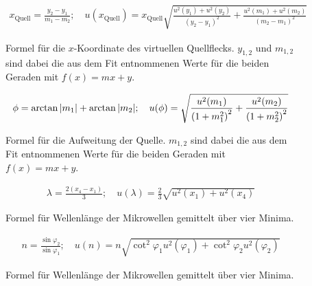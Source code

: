 \begin{figure}[ht]
	\begin{align*}
		x_\text{Quell} = \frac{y_2 - y_1}{m_1 - m_2}
		;\quad
		u(x_\text{Quell}) = x_\text{Quell} \sqrt{\frac{u^2(y_1) + u^2(y_2)}{(y_2 - y_1)^2} + \frac{u^2(m_1) + u^2(m_2)}{(m_2 - m_1)^2}}
	\end{align*}
	\caption{Formel für die $x$-Koordinate des virtuellen Quellflecks. $y_{1,2}$ und $m_{1,2}$ sind dabei die aus dem Fit entnommenen Werte für die beiden Geraden mit $f(x) = m x + y$.}
	\label{unc:xquell}
\end{figure}

\begin{figure}[ht]
\begin{align*}
	\phi = \arctan \abs {m_1} + \arctan \abs {m_2}
	;\quad
	u(\phi) = \sqrt{\frac{u^2(m_1)}{\left( 1 + m_1^2 \right) ^2} + \frac{u^2(m_2)}{\left( 1 + m_2^2 \right) ^2}}
\end{align*}
\caption{Formel für die Aufweitung der Quelle. $m_{1,2}$ sind dabei die aus dem Fit entnommenen Werte für die beiden Geraden mit $f(x) = m x + y$.}
	\label{unc:quellWinkel}
\end{figure}

\begin{figure}[ht]
\begin{align*}
	\lambda = \frac{2(x_4 - x_1)}{3}
	;\quad
	u(\lambda) = \frac{2}{3} \sqrt{u^2(x_1) + u^2(x_4)}
\end{align*}
\caption{Formel für Wellenlänge der Mikrowellen gemittelt über vier Minima.}
	\label{unc:wellenlaenge}
\end{figure}


\begin{figure}[ht]
	\begin{align*}
		n = \frac{\sin \varphi_2}{\sin \varphi_1}
		;\quad
		u(n) = n \sqrt{\cot^2 \varphi_1 u^2(\varphi_1) + \cot^2 \varphi_2 u^2(\varphi_2)}
	\end{align*}
	\caption{Formel für Wellenlänge der Mikrowellen gemittelt über vier Minima.}
	\label{unc:nIndexPVC}
\end{figure}
